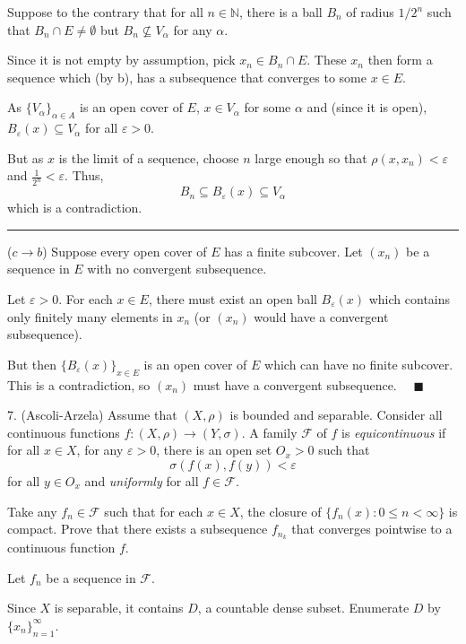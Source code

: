 \documentclass[12pt]{article}
\newcommand{\N}{\mathbb{N}}
\newcommand{\qed}{\quad \blacksquare}
\newcommand{\ep}{\varepsilon}
\newcommand{\sub}{\subseteq}
\renewcommand{\div}{\vspace*{10pt}\hrule \vspace*{10pt}}
\begin{document}
        Suppose to the contrary that for all $n \in \N$, there is a ball $B_n$ of radius $1/2^n$ such that $B_n \cap E \neq \emptyset$ but $B_n \not\sub V_{\alpha}$ for any $\alpha$. 

        Since it is not empty by assumption, pick $x_n \in B_n \cap E$. These $x_n$ then form a sequence which (by b), has a subsequence that converges to some $x \in E$.
        
        As $\{V_{\alpha}\}_{\alpha \in A}$ is an open cover of $E$, $x \in V_{\alpha}$ for some $\alpha$ and (since it is open), $B_{\ep}(x) \sub V_{\alpha}$ for all $\ep > 0$. 
        
        But as $x$ is the limit of a sequence, choose $n$ large enough so that $\rho(x, x_n) < \ep$ and $\frac{1}{2^n} < \ep$. Thus, 
        \[B_n \sub B_{\ep}(x) \sub V_{\alpha}\]
        which is a contradiction. 

        \div  

        ($c \to b$) Suppose every open cover of $E$ has a finite subcover. Let $(x_n)$ be a sequence in $E$ with no convergent subsequence. 

        Let $\ep > 0$. For each $x \in E$, there must exist an open ball $B_{\ep}(x)$ which contains only finitely many elements in $x_n$ (or $(x_n)$ would have a convergent subsequence). 
        
        But then $\{B_{\ep}(x)\}_{x \in E}$ is an open cover of $E$ which can have no finite subcover. This is a contradiction, so $(x_n)$ must have a convergent subsequence. $\qed$

    \color{black}


\pagebreak

7. (Ascoli-Arzela) Assume that $(X, \rho)$ is bounded and separable. Consider all continuous functions $f: (X, \rho) \to (Y, \sigma)$. A family $\mathcal F$ of $f$ is \emph{equicontinuous} if for all $x \in X$, for any $\ep > 0$, there is an open set $O_x > 0$ such that 
\[\sigma(f(x), f(y)) < \ep\]
for all $y \in O_x$ and \emph{uniformly} for all $f \in \mathcal F$.

Take any $f_n \in \mathcal F$ such that for each $x \in X$, the closure of $\{f_n(x): 0 \leq n < \infty\}$ is compact. Prove that there exists a subsequence $f_{n_k}$ that converges pointwise to a continuous function $f$.  

    \color{blue}
        Let $f_n$ be a sequence in $\mathcal F$.

        Since $X$ is separable, it contains $D$, a countable dense subset. Enumerate $D$ by $\{x_n\}_{n=1}^{\infty}$. 
\end{document}
